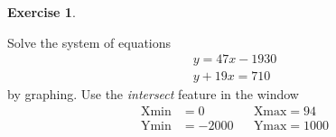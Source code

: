 \documentclass[10pt,]{book}
\theoremstyle{plain}
\theoremstyle{definition}
\theoremstyle{definition}
\theoremstyle{definition}
\theoremstyle{definition}
\newtheorem{exercise}[theorem]{Exercise}
\numberwithin{equation}{section}
\newcommand{\amp}{ & }
\begin{document}
\begin{exercise}\label{exercise-2}

		Solve the system of equations
		\begin{gather*}

				y = 47x − 1930
			\\

				y + 19x = 710
			
\end{gather*}
		by graphing. Use the \emph{intersect} feature in the window
		\begin{align*}

				\text{Xmin} \amp = 0 \amp\amp \text{Xmax} = 94
			\\

				\text{Ymin} \amp = -2000 \amp\amp \text{Ymax} = 1000
			
\end{align*}
\end{exercise}
\par
\end{document}
